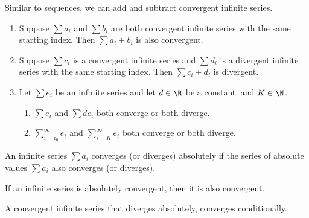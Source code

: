 \documentclass{article}
\begin{document}
\begin{tcolorboxlarge}
    \begin{theorem}
        Similar to sequences, we can add and subtract convergent infinite series.
    \end{theorem}
    \begin{enumerate}
        \item Suppose \(\sum a_i\) and \(\sum b_i\) are both convergent infinite series with the same starting index. Then \(\sum a_i \pm b_i\) is also convergent.
        \item Suppose \(\sum c_i\) is a convergent infinite series and \(\sum d_i\) is a divergent infinite series with the same starting index. Then \(\sum c_i \pm d_i\) is divergent.
        \item Let \(\sum e_i\) be an infinite series and let \(d\in\R\) be a constant, and \(K\in\N\).
              \begin{enumerate}
                  \item \(\sum e_i\) and \(\sum d e_i\) both converge or both diverge.
                  \item \(\sum_{i=i_0}^\infty e_i\) and \(\sum_{i=K}^\infty e_i\) both converge or both diverge.
              \end{enumerate}
    \end{enumerate}
\end{tcolorboxlarge}
%
\begin{definition}
    An infinite series \(\sum a_i\) converges (or diverges) absolutely if the series of absolute values \(\sum a_i\) also converges (or diverges).
\end{definition}
\begin{theorem}
    If an infinite series is absolutely convergent, then it is also convergent.
\end{theorem}
%
\begin{definition}
    A convergent infinite series that diverges absolutely, converges \linebreak conditionally.
\end{definition}
%
\pagebreak
\end{document}
